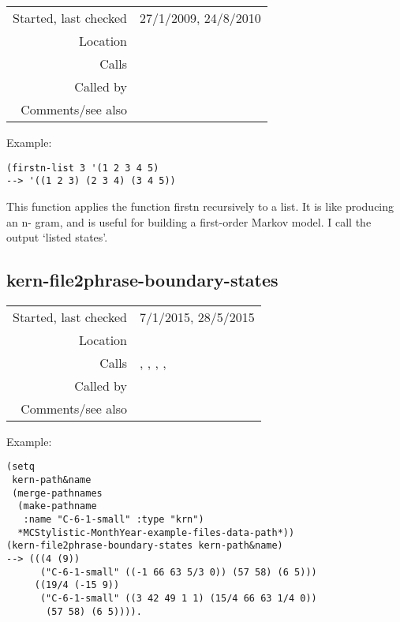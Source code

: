 \vspace{0.3cm}
\begin{tabular}{r|p{8cm}}
Started, last checked & 27/1/2009, 24/8/2010 \\
Location & \nameref{sec:markov-analyse} \\
Calls & \nameref{fun:firstn} \\
Called by & \nameref{fun:markov-analyse} \\
Comments/see also &
\end{tabular}

\vspace{0.5cm}
\noindent Example:
\begin{verbatim}
(firstn-list 3 '(1 2 3 4 5)
--> '((1 2 3) (2 3 4) (3 4 5))
\end{verbatim}

\noindent This function applies the function firstn
recursively to a list. It is like producing an n-
gram, and is useful for building a first-order
Markov model. I call the output `listed states'.


\subsection*{kern-file2phrase-boundary-states}\label{fun:kern-file2phrase-boundary-states}

\vspace{0.3cm}
\begin{tabular}{r|p{8cm}}
Started, last checked & 7/1/2015, 28/5/2015 \\
Location & \nameref{sec:markov-analyse} \\
Calls & \nameref{fun:articulation-points}, \nameref{fun:beat-rel-MNN-states}, \nameref{fun:kern-file2points-artic-dynam-lyrics}, \nameref{fun:remove-duplicates-n-values-too-close}, \nameref{fun:segments-strict} \\
Called by & \nameref{fun:construct-internal-states} \\
Comments/see also & 
\end{tabular}

\vspace{0.5cm}
\noindent Example:
\begin{verbatim}
(setq
 kern-path&name
 (merge-pathnames
  (make-pathname
   :name "C-6-1-small" :type "krn")
  *MCStylistic-MonthYear-example-files-data-path*))
(kern-file2phrase-boundary-states kern-path&name)
--> (((4 (9))
      ("C-6-1-small" ((-1 66 63 5/3 0)) (57 58) (6 5)))
     ((19/4 (-15 9))
      ("C-6-1-small" ((3 42 49 1 1) (15/4 66 63 1/4 0))
       (57 58) (6 5)))).
\end{verbatim}

